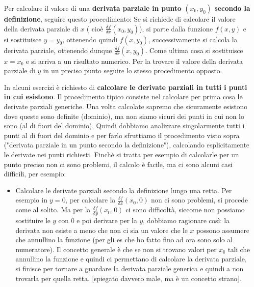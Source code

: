 \begin{tcolorbox}
    Per calcolare il valore di una \textbf{derivata parziale in punto $(x_0, y_0)$ secondo la definizione}, seguire questo procedimento:\newline
    Se si richiede di calcolare il valore della derivata parziale di $x$ ( cioè $\frac{\delta f}{\delta x}(x_0,y_0)$), si parte dalla funzione $f(x,y)$ e si sostituisce $y= y_0$, ottenendo quindi $f(x,y_0)$, successivamente si calcola la derivata parziale, ottenendo dunque $\frac{\delta f}{\delta x} (x,y_0)$. Come ultima cosa si sostituisce $x = x_0$ e si arriva a un risultato numerico. Per la trovare il valore della derivata parziale di $y$ in un preciso punto seguire lo stesso procedimento opposto.
\end{tcolorbox}
\begin{tcolorbox}
In alcuni esercizi è richiesto di \textbf{calcolare le derivate parziali in tutti i punti in cui esistono}. Il procedimento tipico consiste nel calcolare per prima cosa le derivate parziali generiche. Una volta calcolate sapremo che sicuramente esistono dove queste sono definite (dominio), ma non siamo sicuri dei punti in cui non lo sono (al di fuori del dominio). Quindi dobbiamo analizzare singolarmente tutti i punti al di fuori del dominio e per farlo sfruttiamo il procedimento visto sopra ("derivata parziale in un punto secondo la definizione"), calcolando esplicitamente le derivate nei punti richiesti.
Finchè si tratta per esempio di calcolarle per un punto preciso non ci sono problemi, il calcolo è facile, ma ci sono alcuni casi difficili, per esempio:
\begin{itemize}
    \item Calcolare le derivate parziali secondo la definizione lungo una retta. Per esempio in $y=0$, per calcolare la $\frac{\delta f}{\delta x}(x_0, 0)$ non ci sono problemi, si procede come al solito. Ma per la $\frac{\delta f}{\delta y} (x_0, 0)$ ci sono difficoltà, siccome non possiamo sostituire le $y$ con $0$ e poi derivare per la $y$, dobbiamo ragionare così: la derivata non esiste a meno che non ci sia un valore che le $x$ possono assumere che annullino la funzione (per gli es che ho fatto fino ad ora sono solo al numeratore). Il concetto generale è che se non si trovano valori per $x_0$ tali che annullino la funzione e quindi ci permettano di calcolare la derivata parziale, si finisce per tornare a guardare la derivata parziale generica e quindi a non trovarla per quella retta. [spiegato davvero male, ma è un concetto strano].
\end{itemize}
\end{tcolorbox}

